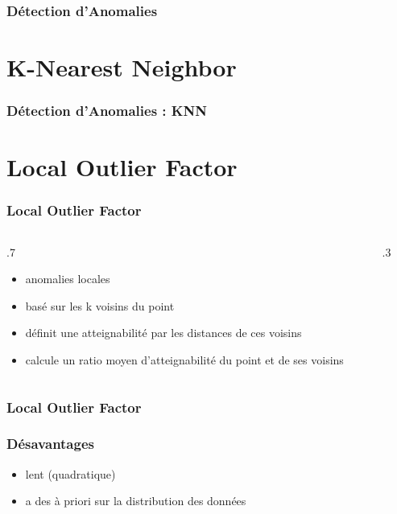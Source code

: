 \documentclass{formation}
\begin{document}
\begin{frame}
  \frametitle{Détection d'Anomalies}
\end{frame}

\section{K-Nearest Neighbor}

\begin{frame}
  \frametitle{Détection d'Anomalies : KNN}
\end{frame}

\section{Local Outlier Factor}

\begin{frame}
  \frametitle{Local Outlier Factor}

  \begin{columns}
    \begin{column}{.7\tw}
      \begin{itemize}[<+->]
      \item anomalies locales
      \item basé sur les k voisins du point
      \item définit une \og atteignabilité\fg{} par les distances de
        ces voisins
      \item calcule un ratio moyen d'atteignabilité du point et de ses
        voisins
      \end{itemize}
    \end{column}
    \begin{column}{.3\tw}
    \end{column}
  \end{columns}
\end{frame}

\begin{frame}
  \frametitle{Local Outlier Factor}
\end{frame}

\begin{frame}
  \frametitle{Désavantages}
  \begin{itemize}
  \item lent (quadratique)
  \item a des à priori sur la distribution des données
  \end{itemize}
\end{frame}
\end{document}
